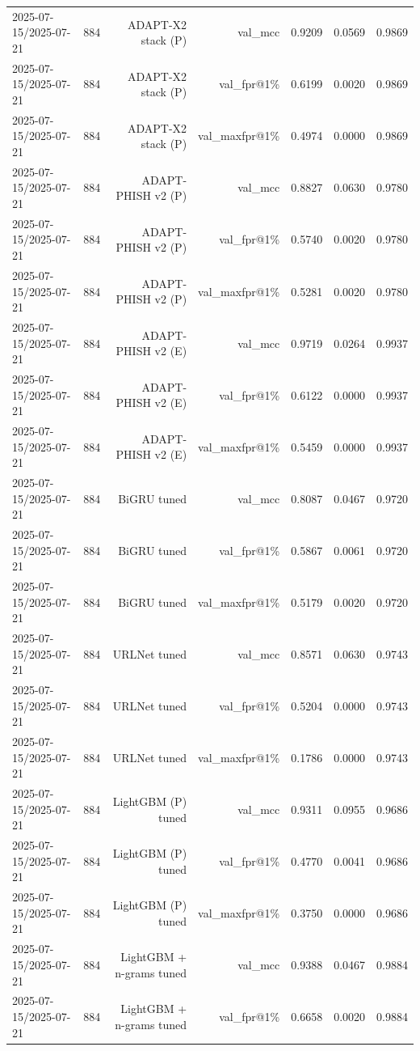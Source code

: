 \begin{table}[t]
\begin{tabular}{llrrrrr}
2025-07-15/2025-07-21 & 884 & ADAPT-X2 stack (P) & val\_mcc & 0.9209 & 0.0569 & 0.9869 \\
2025-07-15/2025-07-21 & 884 & ADAPT-X2 stack (P) & val\_fpr@1\% & 0.6199 & 0.0020 & 0.9869 \\
2025-07-15/2025-07-21 & 884 & ADAPT-X2 stack (P) & val\_maxfpr@1\% & 0.4974 & 0.0000 & 0.9869 \\
2025-07-15/2025-07-21 & 884 & ADAPT-PHISH v2 (P) & val\_mcc & 0.8827 & 0.0630 & 0.9780 \\
2025-07-15/2025-07-21 & 884 & ADAPT-PHISH v2 (P) & val\_fpr@1\% & 0.5740 & 0.0020 & 0.9780 \\
2025-07-15/2025-07-21 & 884 & ADAPT-PHISH v2 (P) & val\_maxfpr@1\% & 0.5281 & 0.0020 & 0.9780 \\
2025-07-15/2025-07-21 & 884 & ADAPT-PHISH v2 (E) & val\_mcc & 0.9719 & 0.0264 & 0.9937 \\
2025-07-15/2025-07-21 & 884 & ADAPT-PHISH v2 (E) & val\_fpr@1\% & 0.6122 & 0.0000 & 0.9937 \\
2025-07-15/2025-07-21 & 884 & ADAPT-PHISH v2 (E) & val\_maxfpr@1\% & 0.5459 & 0.0000 & 0.9937 \\
2025-07-15/2025-07-21 & 884 & BiGRU tuned & val\_mcc & 0.8087 & 0.0467 & 0.9720 \\
2025-07-15/2025-07-21 & 884 & BiGRU tuned & val\_fpr@1\% & 0.5867 & 0.0061 & 0.9720 \\
2025-07-15/2025-07-21 & 884 & BiGRU tuned & val\_maxfpr@1\% & 0.5179 & 0.0020 & 0.9720 \\
2025-07-15/2025-07-21 & 884 & URLNet tuned & val\_mcc & 0.8571 & 0.0630 & 0.9743 \\
2025-07-15/2025-07-21 & 884 & URLNet tuned & val\_fpr@1\% & 0.5204 & 0.0000 & 0.9743 \\
2025-07-15/2025-07-21 & 884 & URLNet tuned & val\_maxfpr@1\% & 0.1786 & 0.0000 & 0.9743 \\
2025-07-15/2025-07-21 & 884 & LightGBM (P) tuned & val\_mcc & 0.9311 & 0.0955 & 0.9686 \\
2025-07-15/2025-07-21 & 884 & LightGBM (P) tuned & val\_fpr@1\% & 0.4770 & 0.0041 & 0.9686 \\
2025-07-15/2025-07-21 & 884 & LightGBM (P) tuned & val\_maxfpr@1\% & 0.3750 & 0.0000 & 0.9686 \\
2025-07-15/2025-07-21 & 884 & LightGBM + n-grams tuned & val\_mcc & 0.9388 & 0.0467 & 0.9884 \\
2025-07-15/2025-07-21 & 884 & LightGBM + n-grams tuned & val\_fpr@1\% & 0.6658 & 0.0020 & 0.9884 \\

\end{tabular}
\end{table}
